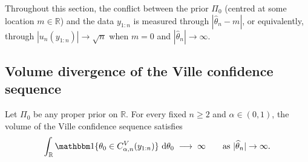 \documentclass[12pt, a4paper]{report}
\newcommand{\dd}{\,\mathrm{d}}
\newcommand{\1}{\mathbf{1}}
\begin{document}
Throughout this section, the conflict between the prior \(\Pi_0\) (centred at some location \(m\in\mathbb{R}\)) and the data \(y_{1:n}\) is measured through \(|\widehat\theta_n-m|\), or equivalently, through \(|u_n(y_{1:n})|\to\sqrt n\) when \(m=0\) and \(|\widehat\theta_n|\to
\infty\).

\subsection{Volume divergence of the Ville confidence sequence}
\label{sec:Ville-divergence}

\begin{theorem}\label{thm:CSVille-divergence}
Let \(\Pi_0\) be any proper prior on \(\mathbb{R}\). For every fixed \(n\geq 2\) and \(\alpha\in(0,1)\), the volume of the Ville confidence sequence satisfies
\[
   \int_\mathbb{R} \one\{\theta_0\in C^V_{\alpha,n}(y_{1:n})\}\,\dd\theta_0
   \;\longrightarrow\;\infty
   \qquad\text{as }|\widehat\theta_n|\to\infty.
\]
\end{theorem}
\end{document}
